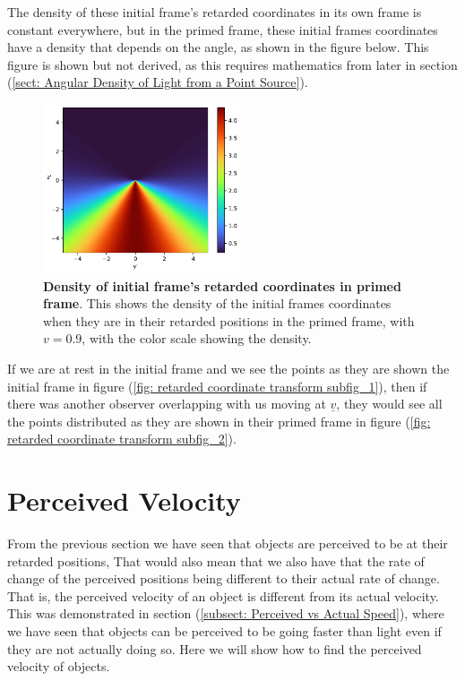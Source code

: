 The density of these initial frame's retarded coordinates in its own frame is constant everywhere, but in the primed frame, these initial frames coordinates have a density that depends on the angle, as shown in the figure below.
This figure is shown but not derived, as this requires mathematics from later in section (\ref{sect: Angular Density of Light from a Point Source}).

\begin{figure}[H]
	\centering
	\includegraphics[height=5cm]{images/pdf/coord_transform_Retarded_Coordinate_Density_Transform.pdf}
	\caption{\textbf{Density of initial frame's retarded coordinates in primed frame}. This shows the density of the initial frames coordinates when they are in their retarded positions in the primed frame, with $v=0.9$, with the color scale showing the density.}
	\label{fig: Density of initial frame's retarded coordinates in primed frame}
\end{figure}

If we are at rest in the initial frame and we see the points as they are shown the initial frame in figure (\ref{fig: retarded coordinate transform subfig_1}), then if there was another observer overlapping with us moving at $\underline{v}$, they would see all the points distributed as they are shown in their primed frame in figure (\ref{fig: retarded coordinate transform subfig_2}).

\section{Perceived Velocity} \label{sect: Perceived Velocity}

From the previous section we have seen that objects are perceived to be at their retarded positions, That would also mean that we also have that the rate of change of the perceived positions being different to their actual rate of change.
That is, the perceived velocity of an object is different from its actual velocity.
This was demonstrated in section (\ref{subsect: Perceived vs Actual Speed}), where we have seen that objects can be perceived to be going faster than light even if they are not actually doing so.
Here we will show how to find the perceived velocity of objects.

